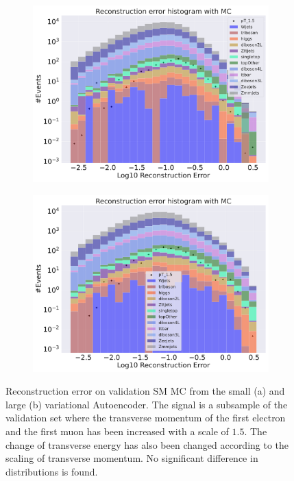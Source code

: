 \begin{figure}[H]
    \centering
    \begin{subfigure}{.45\textwidth}
        \includegraphics[width=\textwidth]{Figures/VAE_testing/small/b_data_recon_big_rm3_feats_sig_pT_1.5.pdf}
        \caption{}
        \label{fig:VAE_small_pt_1_5}
    \end{subfigure}
    \hfill 
    \begin{subfigure}{.45\textwidth}
        \includegraphics[width=\textwidth]{Figures/VAE_testing/big/b_data_recon_big_rm3_feats_sig_pT_1.5.pdf}
        \caption{ }
        \label{fig:VAE_big_pt_1_5}
    \end{subfigure}
    \hfill 
    \caption[VAE |Reconstruction error $p_T$ altering of 1.5]{Reconstruction error on validation SM MC from the small (a) and large (b) variational Autoencoder. The signal is a subsample of the validation 
    set where the transverse momentum of the first electron and the first muon has been increased with a scale of $1.5$. The change of transverse 
    energy has also been changed according to the scaling of transverse momentum. No significant difference in distributions is found. }
    \label{fig:VAE_big_small_pt_1_5}
\end{figure}

